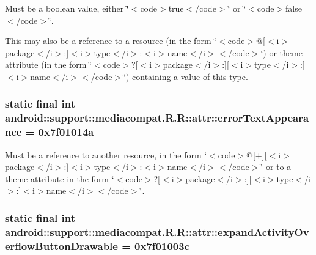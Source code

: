 Must be a boolean value, either \char`\"{}$<$code$>$true$<$/code$>$\char`\"{} or \char`\"{}$<$code$>$false$<$/code$>$\char`\"{}. 

This may also be a reference to a resource (in the form \char`\"{}$<$code$>$@\mbox{[}$<$i$>$package$<$/i$>$:\mbox{]}$<$i$>$type$<$/i$>$:$<$i$>$name$<$/i$>$$<$/code$>$\char`\"{}) or theme attribute (in the form \char`\"{}$<$code$>$?\mbox{[}$<$i$>$package$<$/i$>$:\mbox{]}\mbox{[}$<$i$>$type$<$/i$>$:\mbox{]}$<$i$>$name$<$/i$>$$<$/code$>$\char`\"{}) containing a value of this type. \hypertarget{classandroid_1_1support_1_1mediacompat_1_1_r_1_1attr_4e2612eb23d9f3c949b844ffcc087037}{
\subsubsection[{errorTextAppearance}]{\setlength{\rightskip}{0pt plus 5cm}static final int android::support::mediacompat.R.R::attr::errorTextAppearance = 0x7f01014a}}
\label{classandroid_1_1support_1_1mediacompat_1_1_r_1_1attr_4e2612eb23d9f3c949b844ffcc087037}


Must be a reference to another resource, in the form \char`\"{}$<$code$>$@\mbox{[}+\mbox{]}\mbox{[}$<$i$>$package$<$/i$>$:\mbox{]}$<$i$>$type$<$/i$>$:$<$i$>$name$<$/i$>$$<$/code$>$\char`\"{} or to a theme attribute in the form \char`\"{}$<$code$>$?\mbox{[}$<$i$>$package$<$/i$>$:\mbox{]}\mbox{[}$<$i$>$type$<$/i$>$:\mbox{]}$<$i$>$name$<$/i$>$$<$/code$>$\char`\"{}. \hypertarget{classandroid_1_1support_1_1mediacompat_1_1_r_1_1attr_ceb69f897ae34e0d9e9cb70b4a41a1f6}{
\subsubsection[{expandActivityOverflowButtonDrawable}]{\setlength{\rightskip}{0pt plus 5cm}static final int android::support::mediacompat.R.R::attr::expandActivityOverflowButtonDrawable = 0x7f01003c}}
\label{classandroid_1_1support_1_1mediacompat_1_1_r_1_1attr_ceb69f897ae34e0d9e9cb70b4a41a1f6}


